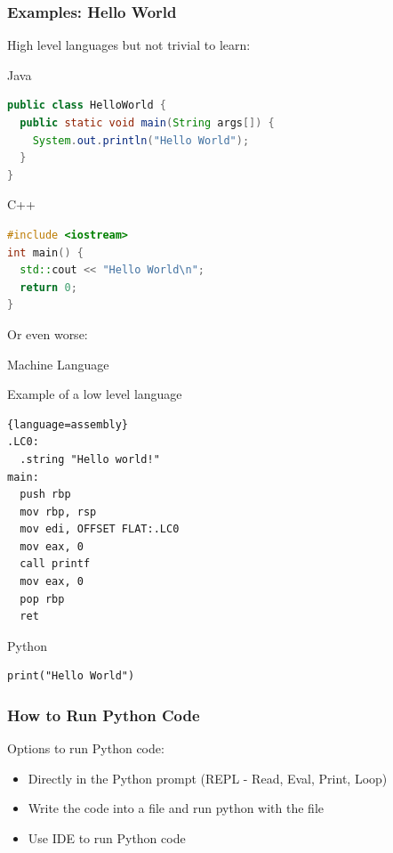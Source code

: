 \documentclass[10pt, a4paper]{beamer} %
\begin{document}
\begin{frame}\frametitle{Examples: Hello World}
  High level languages but not trivial to learn:
  \begin{block}{Java}
    {
      \begin{lstlisting}[language=Java]
public class HelloWorld {
  public static void main(String args[]) {
    System.out.println("Hello World");
  }
}
  \end{lstlisting}
    }
  \end{block}

  \begin{block}{C++}
    {
      \begin{lstlisting}[language=C++, morekeywords=include]
#include <iostream>
int main() {
  std::cout << "Hello World\n";
  return 0;
}
  \end{lstlisting}
    }
  \end{block}
  \framebreak
  Or even worse:
  \begin{block}{Machine Language}

    Example of a low level language
    \begin{lstlisting}{language=assembly}
.LC0:
  .string "Hello world!"
main:
  push rbp
  mov rbp, rsp
  mov edi, OFFSET FLAT:.LC0
  mov eax, 0
  call printf
  mov eax, 0
  pop rbp
  ret
\end{lstlisting}

  \end{block}

  \begin{block}{Python}
    \begin{lstlisting}
print("Hello World")
    \end{lstlisting}
  \end{block}

\end{frame}

\begin{frame}[fragile,c]\frametitle{How to Run Python Code}

  \begin{block}{Options to run Python code:}
    \begin{itemize}
      \item Directly in the Python prompt (REPL - Read, Eval, Print, Loop)
      \item Write the code into a file and run python with the file
      \item Use IDE to run Python code
    \end{itemize}
  \end{block}

\end{frame}
\end{document}
